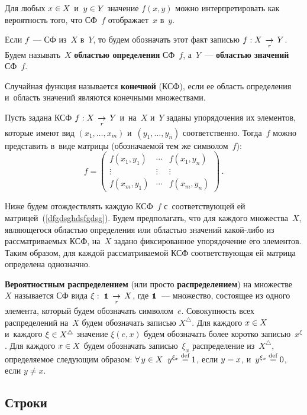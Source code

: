 \begin{multicols}{2}
Для любых $x\hm\in X$ и~$y\hm\in Y$
значение $f(x,y)$ можно интерпретировать
как вероятность того, что СФ~$f$ отображает~$x$ в~$y$.

Если $f$~--- СФ из~$X$ в~$Y$, то  будем обозначать этот факт
записью $f: X\;\mathop{\to}\limits_{r}\; Y$.
Будем называть~$X$ \textbf{об\-ластью определения} СФ~$f$,
а~$Y$~--- \textbf{\bf обл\-астью значений} СФ~$f$.

Случайная функция называется \textbf{конечной} (КСФ),
если ее область определения и~область значений являются конечными множествами.


Пусть задана КСФ $f: X\;\mathop{\to}\limits_{r}\; Y$  и~на~$X$ и~$Y$ заданы  упорядочения их элементов,
которые имеют вид $(x_1,\ldots, x_m)$ и~$(y_1,\ldots, y_n)$
соответственно.
Тогда~$f$ можно представить в~виде матрицы
(обозначаемой тем же символом~$f$):
\begin{equation}
\label{dfgdsghdsfgdsg}
f=
\begin{pmatrix}
f(x_1,y_1)&\cdots&f(x_1,y_n)\\
\vdots&\vdots&\vdots\\
f(x_m,y_1)&\cdots&f(x_m,y_n)
\end{pmatrix}\,.
\end{equation}

Ниже  будем отождествлять каждую КСФ~$f$\linebreak
с~соответствующей ей матрицей~(\ref{dfgdsghdsfgdsg}).
Будем пред\-полагать, что для каждого множества~$X$,
 явля\-юще\-го\-ся областью определения или областью значений
ка\-кой-ли\-бо из рассматриваемых КСФ, на~$X$
задано фиксированное упорядочение его элементов. Таким образом,
для каждой рассматриваемой КСФ соответствующая  ей матрица
определена од\-но\-значно.


\textbf{Вероятностным распределением} (или просто \textbf{распределением})
на множестве~$X$ называется  СФ вида $\xi:\;\mbox{{\small \tt {1}}\hspace{-1.3mm}{\tt 1}} \;\mathop{\to}\limits_{r}\; X$,
где $\mbox{{\small \tt {1}}\hspace{-1.3mm}{\tt 1}}$~--- множество, состоящее из одного элемента, который
 будем обозначать символом~$e$.
Совокупность всех распределений на~$X$  будем
обозначать записью $X^\bigtriangleup$.
Для каждого $x\hm\in X$ и~каждого $\xi\hm\in X^\bigtriangleup$
значение $\xi(e,x)$   будем обозначать более коротко записью~$x^\xi$.
Для каждого $x\hm\in X$  будем обозначать записью~$\xi_x$ распределение
из~$X^\bigtriangleup$,
определяемое следующим образом:
$\forall\, y\in X\;\;y^{\xi_x}\mathbin{{\mathop{=}\limits^{\mathrm{def}}}} 1$, если $y\hm=x$,
и~$y^{\xi_x}\mathbin{{\mathop{=}\limits^{\mathrm{def}}}} 0$, если $y\not =x$.

\subsection{Строки}


\end{multicols}
